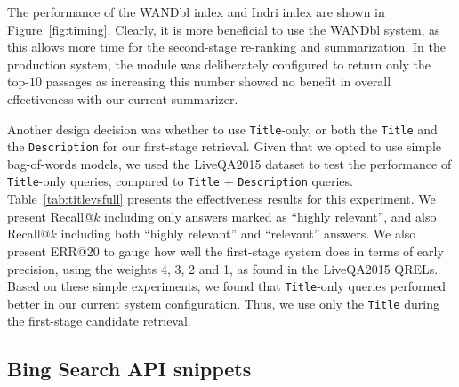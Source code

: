 \documentclass[a4paper,10pt,conference,compsocconf,final]{IEEEtran}
\newcommand{\shane}[1]{\textrm{\textcolor{orange}{Shane says: #1}}}
\newcommand{\ruey}[1]{\textrm{\textcolor{red}{Ruey says: #1}}}
\newcommand{\joel}[1]{\textrm{\textcolor{magenta}{Joel says: #1}}}
\begin{document}



The performance of the {\footnotesize{\sf WANDbl}} index and Indri
index are shown in Figure~{\ref{fig:timing}}.
Clearly, it is more beneficial to use the {\footnotesize{\sf
WANDbl}} system, as this allows more time for the second-stage
re-ranking and summarization.
In the production system, the module was deliberately configured to
return only the top-$10$ passages as increasing this number showed no
benefit in overall effectiveness with our current summarizer.

Another design decision was whether to use {\tt Title}-only, or both the
{\tt Title} and the {\tt Description} for our first-stage retrieval.
Given that we opted to use simple bag-of-words models, we used the
LiveQA2015 dataset to test the performance of {\tt Title}-only queries,
compared to {\tt Title} + {\tt Description} queries.
Table~{\ref{tab:titlevsfull}} presents the effectiveness results for
this experiment.
We present Recall@$k$ including only answers marked as ``highly
relevant'', and also Recall@$k$ including both ``highly relevant'' and
``relevant'' answers.
We also present ERR@20 to gauge how well the first-stage system does
in terms of early precision, using the weights 4, 3, 2 and 1, as
found in the LiveQA2015 QRELs.
Based on these simple experiments, we found that {\tt Title}-only
queries performed better in our current system configuration.
Thus, we use only the {\tt Title} during the first-stage candidate retrieval.

\subsection{Bing Search API snippets}\label{sec:bing}
\end{document}
